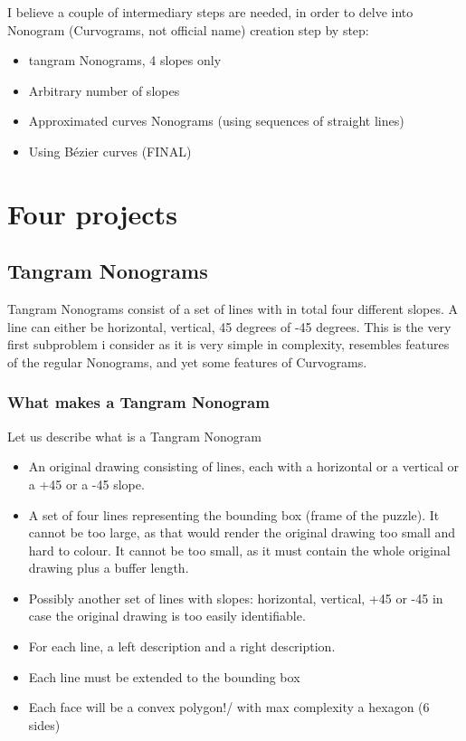 \documentclass{article}
\begin{document}
I believe a couple of intermediary steps are needed, in order to delve into Nonogram (Curvograms, not official name) creation step by step:
\begin{itemize}
\item tangram Nonograms, 4 slopes only
\item Arbitrary number of slopes
\item Approximated curves Nonograms (using sequences of straight lines)
\item Using Bézier curves (FINAL)
\end{itemize}
\section{Four projects}

\subsection{Tangram Nonograms}

Tangram Nonograms consist of a set of lines with in total four different slopes. A line can either be horizontal, vertical, 45 degrees of -45 degrees. This is the very first subproblem i consider as it is very simple in complexity, resembles features of the regular Nonograms, and yet some features of Curvograms.\\

\subsubsection{What makes a Tangram Nonogram}

Let us describe what is a Tangram Nonogram

\begin{itemize}

\item An original drawing consisting of lines, each with a horizontal or a vertical or a +45 or a -45 slope.

\item A set of four lines representing the bounding box (frame of the puzzle). It cannot be too large, as that would render the original drawing too small and hard to colour. It cannot be too small, as it must contain the whole original drawing plus a buffer length.

\item Possibly another set of lines with slopes: horizontal, vertical, +45 or -45 in case the original drawing is too easily identifiable.

\item For each line, a left description and a right description.

\item Each line must be extended to the bounding box

\item Each face will be a convex polygon!/ with max complexity a hexagon (6 sides)

\end{itemize}
\end{document}
